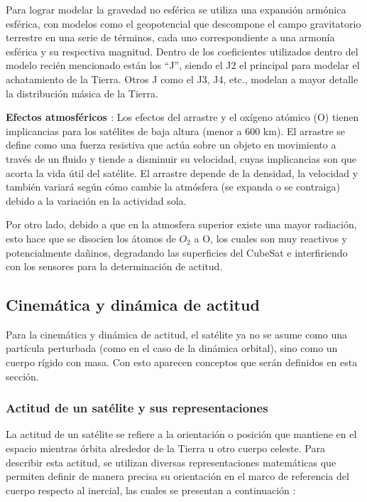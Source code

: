 Para lograr modelar la gravedad no esférica se utiliza una expansión armónica esférica, con modelos como el geopotencial que descompone el campo gravitatorio terrestre en una serie de términos, cada uno correspondiente a una armonía esférica y su respectiva magnitud. Dentro de los coeficientes utilizados dentro del modelo recién mencionado están los “J”, siendo el J2 el principal para modelar el achatamiento de la Tierra. Otros J como el J3, J4, etc., modelan a mayor detalle la distribución másica de la Tierra.

\textbf{Efectos atmosféricos \cite{ref26}}: Los efectos del arrastre y el oxígeno atómico (O) tienen implicancias para los satélites de baja altura (menor a 600 km). El arrastre se define como una fuerza resistiva que actúa sobre un objeto en movimiento a través de un fluido y tiende a disminuir su velocidad, cuyas implicancias son que acorta la vida útil del satélite. El arrastre depende de la densidad, la velocidad y también variará según cómo cambie la atmósfera (se expanda o se contraiga) debido a la variación en la actividad sola. 

Por otro lado, debido a que en la atmosfera superior existe una mayor radiación, esto hace que se disocien los átomos de $O_{2}$ a O, los cuales son muy reactivos y potencialmente dañinos, degradando las superficies del CubeSat e interfiriendo con los sensores para la determinación de actitud.

\subsection{Cinemática y dinámica de actitud}

Para la cinemática y dinámica de actitud, el satélite ya no se asume como una partícula perturbada (como en el caso de la dinámica orbital), sino como un cuerpo rígido con masa. Con esto aparecen conceptos que serán definidos en esta sección.

\subsubsection{Actitud de un satélite y sus representaciones}

La actitud de un satélite se refiere a la orientación o posición que mantiene en el espacio mientras órbita alrededor de la Tierra u otro cuerpo celeste. Para describir esta actitud, se utilizan diversas representaciones matemáticas que permiten definir de manera precisa su orientación en el marco de referencia del cuerpo respecto al inercial, las cuales se presentan a continuación \cite{ref23}:


